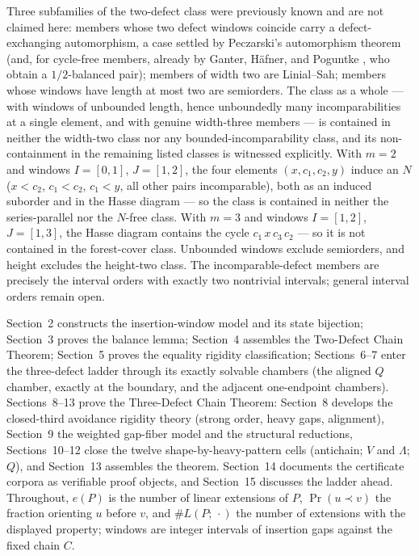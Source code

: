 \documentclass[11pt]{article}
\theoremstyle{definition}
\theoremstyle{remark}
\newcommand{\pr}{\operatorname{Pr}}
\begin{document}
Three subfamilies of the two-defect class were previously known and are not claimed here:
members whose two defect windows coincide carry a defect-exchanging automorphism, a case
settled by Peczarski's automorphism theorem \cite{peczarski-aut} (and, for cycle-free
members, already by Ganter, H\"afner, and Poguntke \cite{ghp}, who obtain a $1/2$-balanced
pair); members of width two are Linial--Sah; members whose windows have
length at most two are semiorders. The class as a whole --- with windows of unbounded length, hence unboundedly many
incomparabilities at a single element, and with genuine width-three members --- is
contained in neither the width-two class nor any bounded-incomparability class, and its
non-containment in the remaining listed classes is witnessed explicitly. With $m=2$ and
windows $I=[0,1]$, $J=[1,2]$, the four elements $(x,c_1,c_2,y)$ induce an $N$ ($x<c_2$,
$c_1<c_2$, $c_1<y$, all other pairs incomparable), both as an induced suborder and in
the Hasse diagram --- so the class is contained in neither the series-parallel nor the
$N$-free class. With $m=3$ and windows $I=[1,2]$, $J=[1,3]$, the Hasse diagram contains
the cycle $c_1\,x\,c_3\,c_2$ --- so it is not contained in the forest-cover class.
Unbounded windows exclude semiorders, and height excludes the height-two class. The incomparable-defect
members are precisely the interval orders with exactly two nontrivial intervals; general
interval orders remain open.

Section~2 constructs the insertion-window model and its state bijection; Section~3
proves the balance lemma; Section~4 assembles the Two-Defect Chain Theorem; Section~5
proves the equality rigidity classification; Sections~6--7 enter the three-defect ladder
through its exactly solvable chambers (the aligned $Q$ chamber, exactly at the boundary,
and the adjacent one-endpoint chambers). Sections~8--13 prove the Three-Defect Chain
Theorem: Section~8 develops the closed-third avoidance rigidity theory (strong order,
heavy gaps, alignment), Section~9 the weighted gap-fiber model and the structural
reductions, Sections~10--12 close the twelve shape-by-heavy-pattern cells (antichain;
$V$ and $\Lambda$; $Q$), and Section~13 assembles the theorem. Section~14 documents the
certificate corpora as verifiable proof objects, and Section~15 discusses the ladder
ahead. Throughout, $e(P)$ is the number of linear extensions of $P$, $\pr(u\prec v)$ the
fraction orienting $u$ before $v$, and $\#L(P;\,\cdot)$ the number of extensions with the
displayed property; windows are integer intervals of insertion gaps against the fixed
chain $C$.
\end{document}
